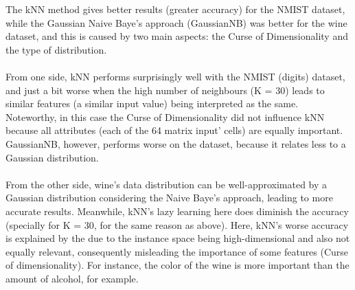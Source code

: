 \documentclass{article}
\begin{document}
The kNN method gives better results (greater accuracy) for the NMIST dataset, while the Gaussian Naive Baye's approach (GaussianNB) was better for the wine dataset, and this is caused by two main aspects: the Curse of Dimensionality and the type of distribution.
\\
\\
From one side, kNN performs surprisingly well with the NMIST (digits) dataset, and just a bit worse when the high number of neighbours (K = 30) leads to similar features (a similar input value) being interpreted as the same. Noteworthy, in this case the Curse of Dimensionality did not influence kNN because all attributes (each of the 64 matrix input' cells) are equally important. GaussianNB, however, performs worse on the dataset, because it relates less to a Gaussian distribution. 
\\
\\
From the other side, wine's data distribution can be well-approximated by a Gaussian distribution considering the Naive Baye's approach, leading to more accurate results. Meanwhile, kNN's lazy learning here does diminish the accuracy (specially for K = 30, for the same reason as above). Here, kNN's worse accuracy is explained by the due to the instance space being high-dimensional and also not equally relevant, consequently misleading the importance of some features (Curse of dimensionality). For instance, the color of the wine is more important than the amount of alcohol, for example.







\newpage
\end{document}
